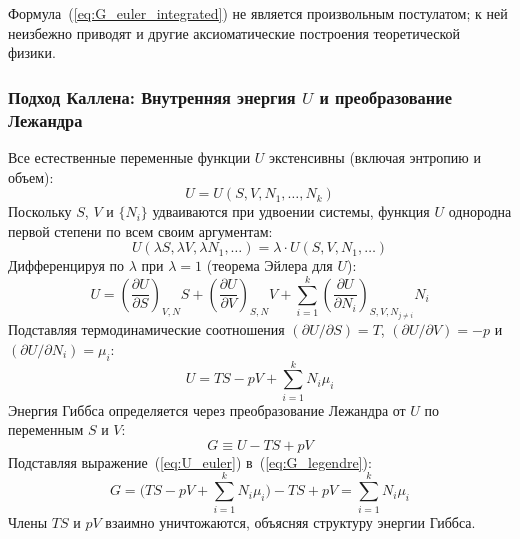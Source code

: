 \documentclass[12pt,a4paper]{article}
\begin{document}
Формула~(\ref{eq:G_euler_integrated}) не является произвольным постулатом; к ней неизбежно приводят и другие аксиоматические построения теоретической физики.

\subsubsection{Подход Каллена: Внутренняя энергия \texorpdfstring{$U$}{U} и преобразование Лежандра}
Все естественные переменные функции $U$ экстенсивны (включая энтропию и объем):
\begin{equation}
    U = U(S, V, N_1, \dots, N_k)
\end{equation}
Поскольку $S$, $V$ и $\{N_i\}$ удваиваются при удвоении системы, функция $U$ однородна первой степени по всем своим аргументам:
\begin{equation}
    U(\lambda S, \lambda V, \lambda N_1, \dots) = \lambda \cdot U(S, V, N_1, \dots)
\end{equation}
Дифференцируя по $\lambda$ при $\lambda = 1$ (теорема Эйлера для $U$):
\begin{equation}
    U = \left(\frac{\partial U}{\partial S}\right)_{V,N} S + \left(\frac{\partial U}{\partial V}\right)_{S,N} V + \sum_{i=1}^k \left(\frac{\partial U}{\partial N_i}\right)_{S,V,N_{j\neq i}} N_i
\end{equation}
Подставляя термодинамические соотношения $(\partial U/\partial S) = T$, $(\partial U/\partial V) = -p$ и $(\partial U/\partial N_i) = \mu_i$:
\begin{equation}
    U = TS - pV + \sum_{i=1}^k N_i \mu_i
    \label{eq:U_euler}
\end{equation}
Энергия Гиббса определяется через преобразование Лежандра от $U$ по переменным $S$ и $V$:
\begin{equation}
    G \equiv U - TS + pV
    \label{eq:G_legendre}
\end{equation}
Подставляя выражение~(\ref{eq:U_euler}) в~(\ref{eq:G_legendre}):
\begin{equation}
    G = \Big( TS - pV + \sum_{i=1}^k N_i \mu_i \Big) - TS + pV = \sum_{i=1}^k N_i \mu_i
\end{equation}
Члены $TS$ и $pV$ взаимно уничтожаются, объясняя структуру энергии Гиббса.
\end{document}
